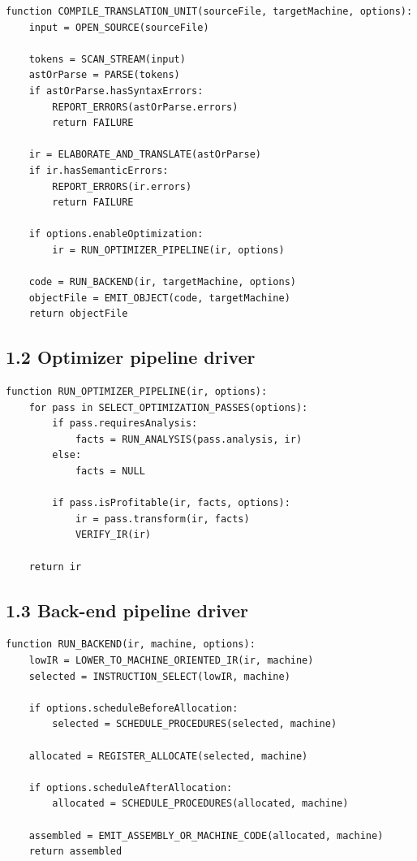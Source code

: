 \documentclass[10pt,letterpaper]{article}
\begin{document}
\begin{verbatim}
function COMPILE_TRANSLATION_UNIT(sourceFile, targetMachine, options):
    input = OPEN_SOURCE(sourceFile)

    tokens = SCAN_STREAM(input)
    astOrParse = PARSE(tokens)
    if astOrParse.hasSyntaxErrors:
        REPORT_ERRORS(astOrParse.errors)
        return FAILURE

    ir = ELABORATE_AND_TRANSLATE(astOrParse)
    if ir.hasSemanticErrors:
        REPORT_ERRORS(ir.errors)
        return FAILURE

    if options.enableOptimization:
        ir = RUN_OPTIMIZER_PIPELINE(ir, options)

    code = RUN_BACKEND(ir, targetMachine, options)
    objectFile = EMIT_OBJECT(code, targetMachine)
    return objectFile
\end{verbatim}

\subsection*{1.2 Optimizer pipeline driver}

\begin{verbatim}
function RUN_OPTIMIZER_PIPELINE(ir, options):
    for pass in SELECT_OPTIMIZATION_PASSES(options):
        if pass.requiresAnalysis:
            facts = RUN_ANALYSIS(pass.analysis, ir)
        else:
            facts = NULL

        if pass.isProfitable(ir, facts, options):
            ir = pass.transform(ir, facts)
            VERIFY_IR(ir)

    return ir
\end{verbatim}

\subsection*{1.3 Back-end pipeline driver}

\begin{verbatim}
function RUN_BACKEND(ir, machine, options):
    lowIR = LOWER_TO_MACHINE_ORIENTED_IR(ir, machine)
    selected = INSTRUCTION_SELECT(lowIR, machine)

    if options.scheduleBeforeAllocation:
        selected = SCHEDULE_PROCEDURES(selected, machine)

    allocated = REGISTER_ALLOCATE(selected, machine)

    if options.scheduleAfterAllocation:
        allocated = SCHEDULE_PROCEDURES(allocated, machine)

    assembled = EMIT_ASSEMBLY_OR_MACHINE_CODE(allocated, machine)
    return assembled
\end{verbatim}
\end{document}
